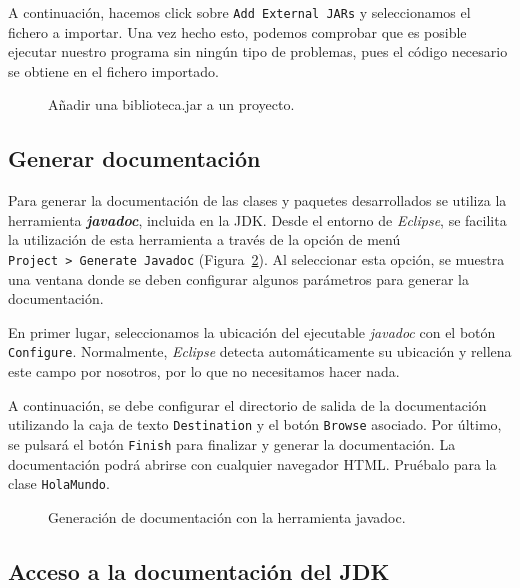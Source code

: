 \documentclass[
  spanish,
  11pt,
  a4paper,
  DIV=11,
  numbers=noendperiod]{scrartcl}
\begin{document}
A continuación, hacemos click sobre \texttt{Add\ External\ JARs} y seleccionamos el fichero a importar. Una vez hecho esto, podemos comprobar que es posible ejecutar nuestro programa sin ningún tipo de problemas, pues el código necesario se obtiene en el fichero importado.

\begin{figure}
\caption{Añadir una biblioteca.jar a un proyecto.}\label{fig-add_jar}
\end{figure}

\subsection{Generar documentación}\label{generar-documentaciuxf3n}

Para generar la documentación de las clases y paquetes desarrollados se utiliza la herramienta \textbf{\emph{javadoc}}, incluida en la JDK. Desde el entorno de \emph{Eclipse}, se facilita la utilización de esta herramienta a través de la opción de menú \texttt{Project\ \textgreater{}\ Generate\ Javadoc} (Figura~\ref{fig-javadoc}). Al seleccionar esta opción, se muestra una ventana donde se deben configurar algunos parámetros para generar la documentación.

En primer lugar, seleccionamos la ubicación del ejecutable \emph{javadoc} con el botón \texttt{Configure}. Normalmente, \emph{Eclipse} detecta automáticamente su ubicación y rellena este campo por nosotros, por lo que no necesitamos hacer nada.

A continuación, se debe configurar el directorio de salida de la documentación utilizando la caja de texto \texttt{Destination} y el botón \texttt{Browse} asociado. Por último, se pulsará el botón \texttt{Finish} para finalizar y generar la documentación. La documentación podrá abrirse con cualquier navegador HTML. Pruébalo para la clase \texttt{HolaMundo}.

\begin{figure}
\caption{Generación de documentación con la herramienta javadoc.}\label{fig-javadoc}
\end{figure}

\subsection{Acceso a la documentación del JDK}\label{acceso-a-la-documentaciuxf3n-del-jdk}
\end{document}
